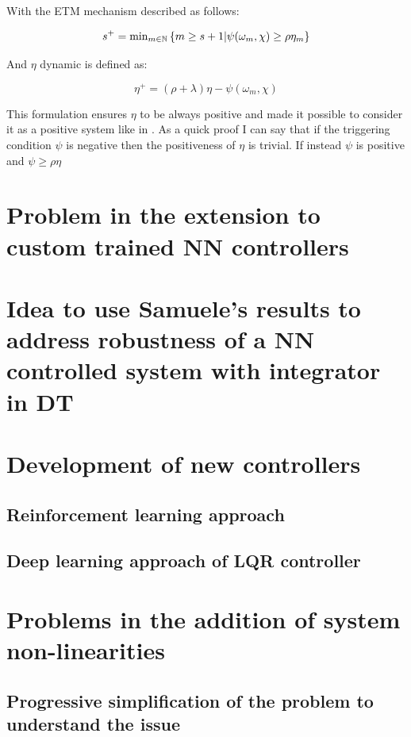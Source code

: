 \documentclass{article}
\begin{document}
With the ETM mechanism described as follows:

$$
s^{+} = \text{min}_{m \in {\mathbb{N}}} \left\{ m \geq s + 1 | \psi(\omega_m, \chi) \geq \rho \eta_m \right\}
$$

And $\eta$ dynamic is defined as:

$$
  \eta^{+} = (\rho + \lambda) \eta - \psi(\omega_m, \chi)
$$

This formulation ensures $\eta$ to be always positive and made it possible to consider it as a positive system like in \cite{positive-systems}. 
As a quick proof I can say that if the triggering condition $\psi$ is negative then the positiveness of $\eta$ is trivial. If instead $\psi$ is positive and $\psi \geq \rho \eta $

\section*{Problem in the extension to custom trained NN controllers}

\section*{Idea to use Samuele's results to address robustness of a NN controlled system with integrator in DT}

\section*{Development of new controllers}

\subsection*{Reinforcement learning approach}

\subsection*{Deep learning approach of LQR controller} 

\section*{Problems in the addition of system non-linearities} 

\subsection*{Progressive simplification of the problem to understand the issue}
\end{document}
